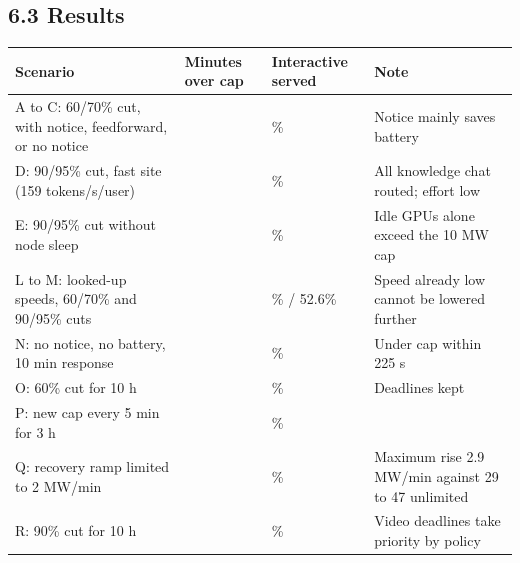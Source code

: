 \documentclass[10pt,letterpaper]{article}
\newcounter{none}
\begin{document}
\subsection{6.3 Results}\label{results}

{\def\LTcaptype{none} %
{\footnotesize\setlength{\tabcolsep}{3.8pt}\renewcommand{\arraystretch}{1.15}
\begin{longtable}[]{@{}
  >{\raggedright\arraybackslash}p{}
  >{\raggedright\arraybackslash}p{}
  >{\raggedright\arraybackslash}p{}
  >{\raggedright\arraybackslash}p{}@{}}
\toprule\noalign{}
\begin{minipage}[b]{\linewidth}\raggedright
\textbf{Scenario}
\end{minipage} & \begin{minipage}[b]{\linewidth}\raggedright
\textbf{Minutes over cap}
\end{minipage} & \begin{minipage}[b]{\linewidth}\raggedright
\textbf{Interactive served}
\end{minipage} & \begin{minipage}[b]{\linewidth}\raggedright
\textbf{Note}
\end{minipage} \\
\midrule\noalign{}
\endhead
\bottomrule\noalign{}
\endlastfoot
A to C: 60/70\% cut, with notice, feedforward, or no notice & 0 & 100\%
& Notice mainly saves battery \\
D: 90/95\% cut, fast site (159 tokens/s/user) & 0 & 100\% & All
knowledge chat routed; effort low \\
E: 90/95\% cut without node sleep & 96 & 1\% & Idle GPUs alone exceed
the 10 MW cap \\
L to M: looked-up speeds, 60/70\% and 90/95\% cuts & 0 & 100\% / 52.6\%
& Speed already low cannot be lowered further \\
N: no notice, no battery, 10 min response & 7.5 & 99.8\% & Under cap
within 225 s \\
O: 60\% cut for 10 h & 0 & 100\% & Deadlines kept \\
P: new cap every 5 min for 3 h & 0 & 98.8\% & \\
Q: recovery ramp limited to 2 MW/min & 0 & 100\% & Maximum rise 2.9
MW/min against 29 to 47 unlimited \\
R: 90\% cut for 10 h & 0 & 13\% & Video deadlines take priority by
policy \\
\end{longtable}
}
}
\end{document}
